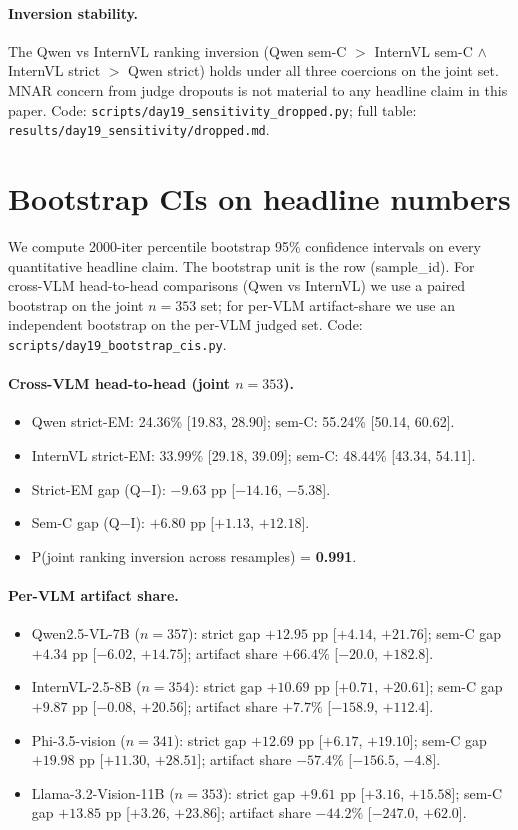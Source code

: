 \paragraph{Inversion stability.}
The Qwen vs InternVL ranking inversion (Qwen sem-C $>$ InternVL sem-C $\wedge$ InternVL strict $>$ Qwen strict) holds under all three coercions on the joint set. MNAR concern from judge dropouts is not material to any headline claim in this paper. Code: \texttt{scripts/day19\_sensitivity\_dropped.py}; full table: \texttt{results/day19\_sensitivity/dropped.md}.

\section{Bootstrap CIs on headline numbers}
\label{app:bootstrap-cis}

We compute 2000-iter percentile bootstrap 95\% confidence intervals on every quantitative headline claim. The bootstrap unit is the row (sample\_id). For cross-VLM head-to-head comparisons (Qwen vs InternVL) we use a paired bootstrap on the joint $n=353$ set; for per-VLM artifact-share we use an independent bootstrap on the per-VLM judged set. Code: \texttt{scripts/day19\_bootstrap\_cis.py}.

\paragraph{Cross-VLM head-to-head (joint $n=353$).}
\begin{itemize}
\item Qwen strict-EM: 24.36\% [19.83, 28.90]; sem-C: 55.24\% [50.14, 60.62].
\item InternVL strict-EM: 33.99\% [29.18, 39.09]; sem-C: 48.44\% [43.34, 54.11].
\item Strict-EM gap (Q$-$I): $-9.63$ pp [$-14.16$, $-5.38$].
\item Sem-C gap (Q$-$I): $+6.80$ pp [$+1.13$, $+12.18$].
\item P(joint ranking inversion across resamples) = \textbf{0.991}.
\end{itemize}

\paragraph{Per-VLM artifact share.}
\begin{itemize}
\item Qwen2.5-VL-7B ($n=357$): strict gap $+12.95$ pp [$+4.14$, $+21.76$]; sem-C gap $+4.34$ pp [$-6.02$, $+14.75$]; artifact share $+66.4\%$ [$-20.0$, $+182.8$].
\item InternVL-2.5-8B ($n=354$): strict gap $+10.69$ pp [$+0.71$, $+20.61$]; sem-C gap $+9.87$ pp [$-0.08$, $+20.56$]; artifact share $+7.7\%$ [$-158.9$, $+112.4$].
\item Phi-3.5-vision ($n=341$): strict gap $+12.69$ pp [$+6.17$, $+19.10$]; sem-C gap $+19.98$ pp [$+11.30$, $+28.51$]; artifact share $-57.4\%$ [$-156.5$, $-4.8$].
\item Llama-3.2-Vision-11B ($n=353$): strict gap $+9.61$ pp [$+3.16$, $+15.58$]; sem-C gap $+13.85$ pp [$+3.26$, $+23.86$]; artifact share $-44.2\%$ [$-247.0$, $+62.0$].
\end{itemize}

